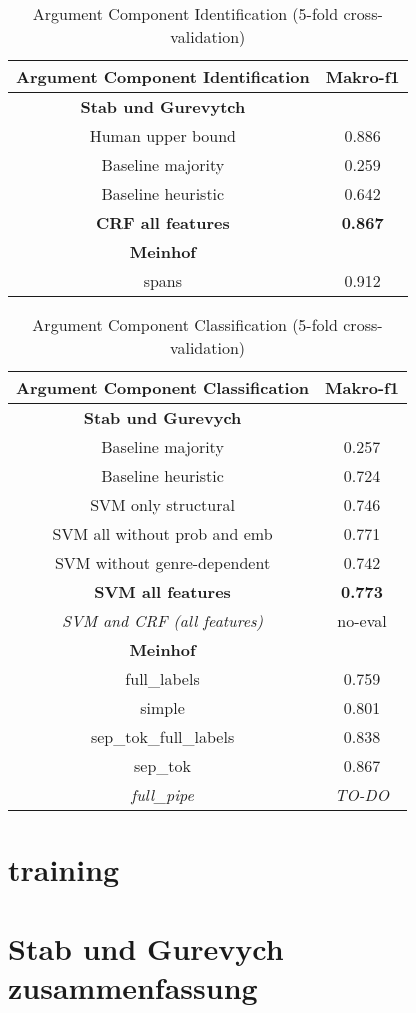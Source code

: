 \documentclass[12]{article}
\newcommand\T{\rule{0pt}{3.6ex}}       %
\newcommand\I{\rule[-1.25ex]{0pt}{0pt}} %
\newcommand\B{\rule[-1.8ex]{0pt}{0pt}} %
\theoremstyle{mytheoremstyle}
\theoremstyle{mytheoremstyle}
\theoremstyle{myproblemstyle}
\begin{document}
  \begin{table}[!h]
    \centering
    \begin{tabular}{c|c} 
      \Large\textbf{Argument Component Identification} &  \Large\textbf{Makro-f1}\\ 
      \hline
      \hline
      \textbf{Stab und Gurevytch}& \T \I \\
      Human upper bound & 0.886\\
      Baseline majority & 0.259\\
      Baseline heuristic & 0.642\\
      \textbf{CRF all features} & \textbf{0.867} \B \\
      \hline
      \textbf{Meinhof} & \T \I \\
      spans & 0.912 \B \\ 
    \end{tabular}
    \caption{Argument Component Identification (5-fold cross-validation)}
    \label{tab:my_label}
  \end{table}

  \begin{table}[!h]
    \centering
    \begin{tabular}{c|c}
      \Large\textbf{Argument Component Classification} &  \Large\textbf{Makro-f1}\\
      \hline
      \hline
      \textbf{Stab und Gurevych} & \T \I \\
      Baseline majority & 0.257\\
      Baseline heuristic & 0.724\\
      SVM only structural & 0.746\\
      SVM all without prob and emb & 0.771\\
      SVM without genre-dependent & 0.742\\
      \textbf{SVM all features} & \textbf{0.773}\\
      \textit{SVM and CRF (all features)} & no-eval \B \\
      \hline
      \textbf{Meinhof} & \T \I \\
      full\_labels & 0.759\\
      simple & 0.801\\
      sep\_tok\_full\_labels & 0.838\\
      sep\_tok & 0.867\\
      \textit{full\_pipe} & \textit{TO-DO} \B \\

    \end{tabular}
    \caption{Argument Component Classification (5-fold cross-validation)}
    \label{tab:my_label}
  \end{table}

  \section{training}
  \section{Stab und Gurevych zusammenfassung}
\end{document}
